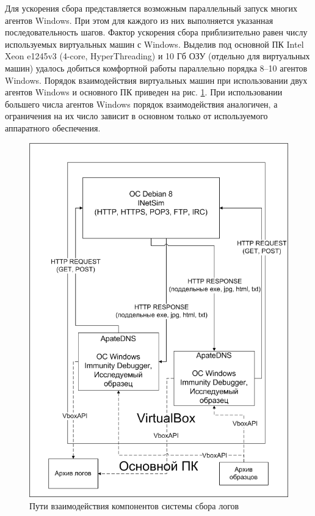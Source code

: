 Для ускорения сбора представляется возможным параллельный запуск многих агентов Windows. При этом для каждого из них выполняется указанная последовательность шагов. Фактор ускорения сбора приблизительно равен числу используемых виртуальных машин с Windows. Выделив под основной ПК Intel Xeon e1245v3 (4-core, HyperThreading) и 10 Гб ОЗУ (отдельно для виртуальных машин) удалось добиться комфортной работы параллельно порядка 8--10 агентов Windows. Порядок взаимодействия виртуальных машин при использовании двух агентов Windows и основного ПК приведен на рис. \ref {fig:vmcycle}. При использовании большего числа агентов Windows порядок взаимодействия аналогичен, а ограничения на их число зависит в основном только от используемого аппаратного обеспечения.
\begin {figure}[h!]
	\centering
	\includegraphics[width=\linewidth] {img/vmcycle.png}
	\caption {Пути взаимодействия компонентов системы сбора логов}
	\label {fig:vmcycle}
\end {figure}

